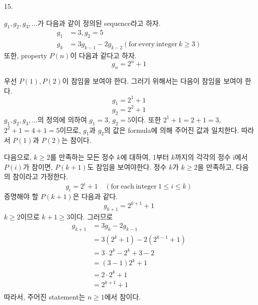 \documentclass{article}
\begin{document}
15.
\begin{addmargin}[1em]{2em}
$g_1, g_2, g_3,...$가 다음과 같이 정의된 sequence라고 하자.
\begin{align*}
g_1 &= 3, g_2 =5 \\
g_k &= 3g_{k-1} - 2g_{k-2} (\mathrm{for\ every\ integer\ } k\ge 3)
\end{align*}
또한, property $P(n)$이 다음과 같다고 하자.
\[g_n=2^n+1\]

우선 $P(1), P(2)$이 참임을 보여야 한다. 그러기 위해서는 다음이 참임을 보여야 한다.
\[g_1 = 2^1 + 1\]
\[g_2 = 2^2 + 1\]
$g_1, g_2, g_3,...$의 정의에 의하여 $g_1 = 3$, $g_2 = 5$이다. 또한 $2^1 + 1 = 2 + 1 = 3$, $2^2 + 1 = 4 + 1 = 5$이므로, $g_1$과 $g_2$의 값은 formula에 의해 주어진 값과 일치한다. 따라서 $P(1)$과 $P(2)$는 참이다.
\newline

다음으로, $k \ge 2$를 만족하는 모든 정수 $k$에 대하여, 1부터 $k$까지의 각각의 정수 i에서 $P(i)$가 참이면, $P(k+1)$도 참임을 보여야한다.
\newline
정수 $k$가 $k \ge 2$을 만족하고, 다음의 참이라고 가정한다.
\[g_i = 2^i+1\quad (\mathrm{for\ each\ integer\ } 1\le i \le k)\]
증명해야 할 $P(k+1)$은 다음과 같다.
\[g_{k+1} = 2^{k+1}+1\]
$k \ge 2$이므로 $k+1 \ge 3$이다. 그러므로
\begin{align*}
g_{k+1} &= 3g_{k} - 2g_{k-1} \\
&= 3(2^k + 1) - 2(2^{k-1} + 1) \\
&= 3\cdot2^k - 2^k + 3 - 2 \\
&= (3-1)2^k + 1 \\
&= 2\cdot2^k + 1 \\
&= 2^{k+1} + 1 \\
\end{align*}
따라서, 주어진 statement는 $n\ge 1$에서 참이다. 
\end{addmargin}
\bigskip
\end{document}
